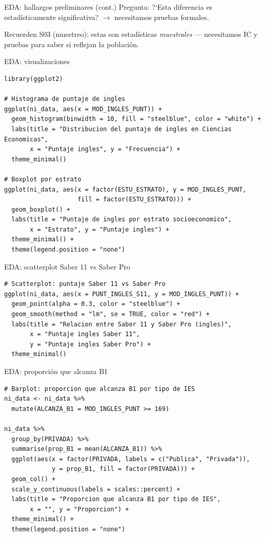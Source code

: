 \documentclass[aspectratio=169, 11pt]{beamer}
\begin{document}
\begin{frame}{EDA: hallazgos preliminares (cont.)}
\textcolor{javeriana}{Pregunta}: ?`Esta diferencia es estad\'isticamente significativa? $\to$ necesitamos pruebas formales.

\vspace{0.3cm}
Recuerden S03 (muestreo): estas son estad\'isticas \textit{muestrales} --- necesitamos IC y pruebas para saber si reflejan la poblaci\'on.
\end{frame}

\begin{frame}[fragile]{EDA: visualizaciones}
\begin{lstlisting}
library(ggplot2)

# Histograma de puntaje de ingles
ggplot(ni_data, aes(x = MOD_INGLES_PUNT)) +
  geom_histogram(binwidth = 10, fill = "steelblue", color = "white") +
  labs(title = "Distribucion del puntaje de ingles en Ciencias Economicas",
       x = "Puntaje ingles", y = "Frecuencia") +
  theme_minimal()

# Boxplot por estrato
ggplot(ni_data, aes(x = factor(ESTU_ESTRATO), y = MOD_INGLES_PUNT,
                    fill = factor(ESTU_ESTRATO))) +
  geom_boxplot() +
  labs(title = "Puntaje de ingles por estrato socioeconomico",
       x = "Estrato", y = "Puntaje ingles") +
  theme_minimal() +
  theme(legend.position = "none")
\end{lstlisting}
\end{frame}

\begin{frame}[fragile]{EDA: scatterplot Saber 11 vs Saber Pro}
\begin{lstlisting}
# Scatterplot: puntaje Saber 11 vs Saber Pro
ggplot(ni_data, aes(x = PUNT_INGLES_S11, y = MOD_INGLES_PUNT)) +
  geom_point(alpha = 0.3, color = "steelblue") +
  geom_smooth(method = "lm", se = TRUE, color = "red") +
  labs(title = "Relacion entre Saber 11 y Saber Pro (ingles)",
       x = "Puntaje ingles Saber 11",
       y = "Puntaje ingles Saber Pro") +
  theme_minimal()
\end{lstlisting}
\end{frame}

\begin{frame}[fragile]{EDA: proporción que alcanza B1}
\begin{lstlisting}
# Barplot: proporcion que alcanza B1 por tipo de IES
ni_data <- ni_data %>%
  mutate(ALCANZA_B1 = MOD_INGLES_PUNT >= 169)

ni_data %>%
  group_by(PRIVADA) %>%
  summarise(prop_B1 = mean(ALCANZA_B1)) %>%
  ggplot(aes(x = factor(PRIVADA, labels = c("Publica", "Privada")),
             y = prop_B1, fill = factor(PRIVADA))) +
  geom_col() +
  scale_y_continuous(labels = scales::percent) +
  labs(title = "Proporcion que alcanza B1 por tipo de IES",
       x = "", y = "Proporcion") +
  theme_minimal() +
  theme(legend.position = "none")
\end{lstlisting}
\end{frame}
\end{document}
